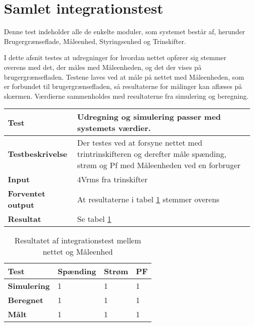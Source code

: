 
\section{Samlet integrationstest}
Denne test indeholder alle de enkelte moduler, som systemet består af, herunder Brugergrænseflade, Måleenhed, Styringsenhed og Trinskifter. 

I dette afsnit testes at udregninger for hvordan nettet opfører sig stemmer overens med det, der måles med Måleenheden, og det der vises på brugergrænsefladen.
Testene laves ved at måle på nettet med Måleenheden, som er forbundet til brugergrænsefladen, så resultaterne for målinger kan aflæses på skærmen. Værdierne sammenholdes med resultaterne fra simulering og beregning. 



\begin{center}
	\begin{tabular}{ | m{} | m{}|} 
		\hline
		\textbf{Test}					&Udregning og simulering passer med systemets værdier. \\ \hline
		\textbf{Testbeskrivelse}		&Der testes ved at forsyne nettet med trintrinskifteren og derefter måle spænding, strøm og Pf med Måleenheden ved en forbruger \\ \hline
		\textbf{Input}					&4Vrms fra trinskifter \\ \hline
		\textbf{Forventet output}		&At resultaterne i tabel \ref{tab:intTest2} stemmer overens \\ \hline
		\textbf{Resultat}				&Se tabel \ref{tab:intTest2} \\ \hline
	\end{tabular}
\end{center}


\begin{table}[H]
	\begin{tabular}{ | m{} | m{} | m{} | m{}|}  
		\hline
		\textbf{Test}			& \textbf{Spænding} & \textbf{Strøm}  	& \textbf{PF}			\\ \hline
		\textbf{Simulering}		&1					&1				  	&1 					\\ \hline
		\textbf{Beregnet}		&1 					&1					&1					\\ \hline
		\textbf{Målt}			&1 					&1					&1					\\ \hline
	\end{tabular}
	\caption{Resultatet af integrationstest mellem nettet og Måleenhed}
	\label{tab:intTest2}
\end{table}
